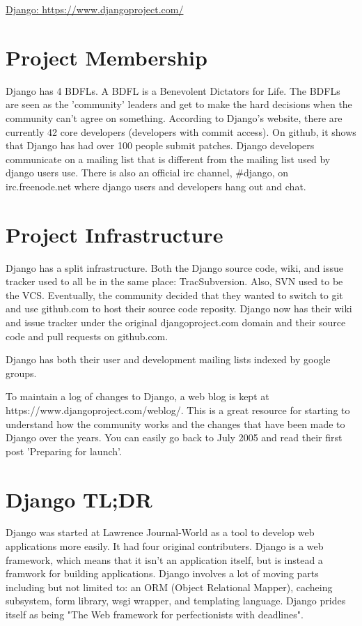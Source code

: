 \documentclass[12pt]{article}
\def\title{Django: https://www.djangoproject.com/}
\begin{document}
\begin{center}
\underline{
\large{\title}
}
\end{center}
\doublespacing

\section{Project Membership}
Django has 4 BDFLs. A BDFL is a Benevolent Dictators for Life. The BDFLs are
seen as the 'community' leaders and get to make the hard decisions when the
community can't agree on something. According to Django's website, there are
currently 42 core developers (developers with commit access). On github, it
shows that Django has had over 100 people submit patches. Django developers
communicate on a mailing list that is different from the mailing list used by
django users use. There is also an official irc channel, \#django, on
irc.freenode.net where django users and developers hang out and chat.

\section{Project Infrastructure}
Django has a split infrastructure. Both the Django source code, wiki, and issue
tracker used to all be in the same place: TracSubversion. Also, SVN used to be
the VCS. Eventually, the community decided that they wanted to switch to git
and use github.com to host their source code reposity. Django now has their
wiki and issue tracker under the original djangoproject.com domain and their
source code and pull requests on github.com.

Django has both their user and development mailing lists indexed by google
groups.

To maintain a log of changes to Django, a web blog is kept at
https://www.djangoproject.com/weblog/. This is a great resource for starting to
understand how the community works and the changes that have been made to
Django over the years. You can easily go back to July 2005 and read their first
post 'Preparing for launch'.

\section{Django TL;DR}
Django was started at Lawrence Journal-World as a tool to develop web
applications more easily. It had four original contributers. Django is a web
framework, which means that it isn't an application itself, but is instead a
framwork for building applications. Django involves a lot of moving parts
including but not limited to: an ORM (Object Relational Mapper), cacheing
subsystem, form library, wsgi wrapper, and templating language. Django prides
itself as being "The Web framework for perfectionists with deadlines".
\end{document}
